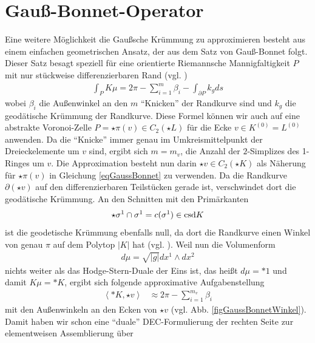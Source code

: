 \section{Gauß-Bonnet-Operator}
  Eine weitere Möglichkeit die Gaußsche Krümmung zu approximieren besteht aus einem einfachen geometrischen Ansatz, der aus dem Satz von
  Gauß-Bonnet folgt. 
  Dieser Satz besagt speziell für eine orientierte Riemannsche Mannigfaltigkeit \( P \) mit nur stückweise differenzierbaren Rand (vgl.
  \cite[Kap.10.5]{berger})
  \begin{align}
    \label{eqGaussBonnet}
    \int_{P}K \mu = 2\pi - \sum_{i=1}^{m}\beta_{i} - \int_{\partial P} k_{g} ds
  \end{align}
  wobei \( \beta_{i} \) die Außenwinkel an den \( m \) "`Knicken"' der Randkurve sind und \( k_{g} \) die geodätische Krümmung der
  Randkurve.
  Diese Formel können wir auch auf eine abstrakte Voronoi-Zelle \( P=\star\pi(v)\in C_{2}(\star L) \) für die Ecke \( v \in K^{(0)}=L^{(0)} \)
  anwenden. 
  Da die "`Knicke"' immer genau im Umkreismittelpunkt der Dreieckelemente um \( v \) sind, 
  ergibt sich \( m=m_{v} \), die Anzahl der \( 2 \)-Simplizes des 1-Ringes um \( v \).
  Die Approximation besteht nun darin \mbox{\( \star v \in C_{2}(\star K) \)} als Näherung für \( \star\pi(v) \) in Gleichung \eqref{eqGaussBonnet}
  zu verwenden.
  Da die Randkurve \( \partial(\star v) \) auf den differenzierbaren Teilstücken gerade ist, verschwindet dort die geodätische Krümmung.
  An den Schnitten mit den Primärkanten 
  \begin{align}
    \star\sigma^{1}\cap\sigma^{1} = c(\sigma^{1})\in \text{csd} K 
  \end{align}
  ist die 
  geodetische Krümmung ebenfalls null,
  da dort die Randkurve einen Winkel von genau \( \pi \) auf dem Polytop \( |K| \) hat (vgl. \cite{polthier}).
  Weil nun die Volumenform 
  \begin{align}
    d\mu = \sqrt{|g|} dx^{1} \wedge dx^{2}
  \end{align}
  nichts weiter als das Hodge-Stern-Duale der Eins ist, das heißt 
  \( d\mu = *1 \) und damit \(  K \mu = *K \), ergibt sich folgende approximative Aufgabenstellung
  \begin{align}
      \label{eqDualGaussBonnet}
      \left\langle *K , \star v \right\rangle &\approx 2\pi - \sum_{i=1}^{m_{v}}\beta_{i}
  \end{align}
  mit den Außenwinkeln an den Ecken von \( \star v \) (vgl. Abb. \ref{figGaussBonnetWinkel}).
  Damit haben wir schon eine "`duale"' DEC-Formulierung der rechten Seite zur elementweisen Assemblierung über
